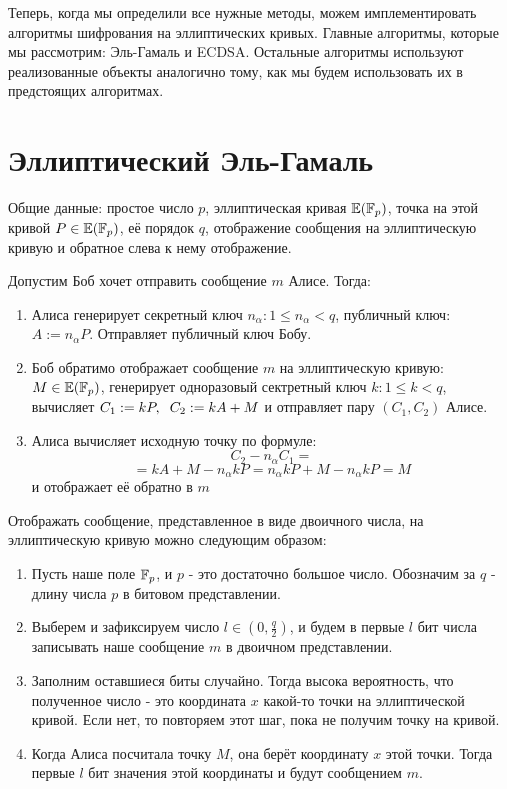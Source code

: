 
Теперь, когда мы определили все нужные методы, можем имплементировать алгоритмы шифрования на эллиптических кривых. Главные алгоритмы, которые мы рассмотрим: Эль-Гамаль и ECDSA. Остальные алгоритмы используют реализованные объекты аналогично тому, как мы будем использовать их в предстоящих алгоритмах.

\section{Эллиптический Эль-Гамаль}
Общие данные: простое число $p$, эллиптическая кривая $\mathbb E(\mathbb F_p)$, точка на этой кривой $P\in\mathbb E(\mathbb F_p)$, её порядок $q$, отображение сообщения на эллиптическую кривую и обратное слева к нему отображение.

  Допустим Боб хочет отправить сообщение $m$ Алисе. Тогда:
  \begin{enumerate}
    \item Алиса генерирует секретный ключ $n_\alpha\colon 1\leqslant n_\alpha<q$, публичный ключ: $A:=n_\alpha P$. Отправляет публичный ключ Бобу.
    \item Боб обратимо отображает сообщение $m$ на эллиптическую кривую: $M\in\mathbb E(\mathbb F_p)$, генерирует одноразовый сектретный ключ $k\colon 1\leqslant k<q$, вычисляет $C_1:=kP,\hspace{0.2cm} C_2:=kA+M$ и отправляет пару $(C_1,C_2)$ Алисе.
    \item Алиса вычисляет исходную точку по формуле:
    \[C_2 - n_\alpha C_1 =\]\[= kA+M - n_\alpha k P = n_\alpha k P + M - n_\alpha k P = M\]
    и отображает её обратно в $m$ 
  \end{enumerate}
  
  Отображать сообщение, представленное в виде двоичного числа, на эллиптическую кривую можно следующим образом:
  \begin{enumerate}
    \item Пусть наше поле $\mathbb F_p$, и $p$ - это достаточно большое число. Обозначим за $q$ - длину числа $p$ в битовом представлении.
    \item Выберем и зафиксируем число $l\in (0, \frac{q}{2})$, и будем в первые $l$ бит числа записывать наше сообщение $m$ в двоичном представлении.
    \item Заполним оставшиеся биты случайно. Тогда высока вероятность, что полученное число - это координата $x$ какой-то точки на эллиптической кривой. Если нет, то повторяем этот шаг, пока не получим точку на кривой.
    \item Когда Алиса посчитала точку $M$, она берёт координату $x$ этой точки. Тогда первые $l$ бит значения этой координаты и будут сообщением $m$. 
  \end{enumerate}

